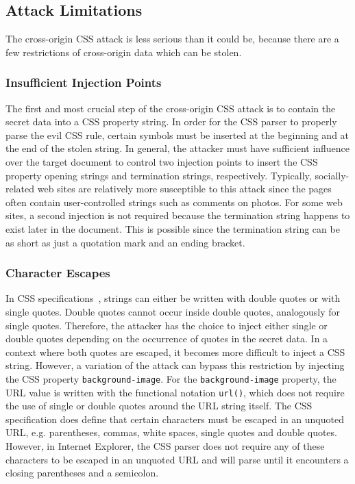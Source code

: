 \documentclass{acm_proc_article-sp}
\begin{document}
\subsection{Attack Limitations}
The cross-origin CSS attack is less serious than it could be, because there are a few restrictions of cross-origin data which can be stolen.

\subsubsection{Insufficient Injection Points}
The first and most crucial step of the cross-origin CSS attack is to contain the secret data into a CSS property string. In order for the CSS parser to properly parse the evil CSS rule, certain symbols must be inserted at the beginning and at the end of the stolen string. In general, the attacker must have sufficient influence over the target document to control two injection points to insert the CSS property opening strings and termination strings, respectively. Typically, socially-related web sites are relatively more susceptible to this attack since the pages often contain user-controlled strings such as comments on photos. For some web sites, a second injection is not required because the termination string happens to exist later in the document. This is possible since the termination string can be as short as just a quotation mark and an ending bracket. 

\subsubsection{Character Escapes} \label{sec:escapes}
In CSS specifications~\cite{css}, strings can either be written with double quotes or with single quotes. Double quotes cannot occur inside double quotes, analogously for single quotes. Therefore, the attacker has the choice to inject either single or double quotes depending on the occurrence of quotes in the secret data. In a context where both quotes are escaped, it becomes more difficult to inject a CSS string. However, a variation of the attack  can bypass this restriction by injecting the CSS property \texttt{background-image}. For the \texttt{background-image} property, the URL value is written with the functional notation \texttt{url()}, which does not require the use of single or double quotes around the URL string itself. The CSS specification does define that certain characters must be escaped in an unquoted URL, e.g. parentheses, commas, white spaces, single quotes and double quotes. However, in Internet Explorer, the CSS parser does not require any of these characters to be escaped in an unquoted URL and will parse until it encounters a closing parentheses and a semicolon.
\end{document}
